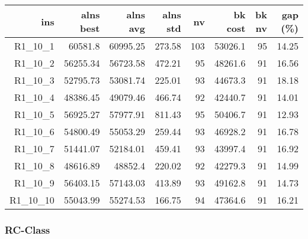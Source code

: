   \begin{table}[caption={Kết quả đo với tập HG\_R\_1\_10 1000 yêu cầu}, label=exp:HGR110]
    \centering
    \begin{tabular}{rrrrrrrr}
    \hline
    ins & alns best & alns avg & alns std & nv & bk cost & bk nv & gap (\%) \\ \hline
    R1\_10\_1 & 60581.8 & 60995.25 & 273.58 & 103 & 53026.1 & 95 & 14.25 \\ \hline
    R1\_10\_2 & 56255.34 & 56723.58 & 472.21 & 95 & 48261.6 & 91 & 16.56 \\ \hline
    R1\_10\_3 & 52795.73 & 53081.74 & 225.01 & 93 & 44673.3 & 91 & 18.18 \\ \hline
    R1\_10\_4 & 48386.45 & 49079.46 & 466.74 & 92 & 42440.7 & 91 & 14.01 \\ \hline
    R1\_10\_5 & 56925.27 & 57977.91 & 811.43 & 95 & 50406.7 & 91 & 12.93 \\ \hline
    R1\_10\_6 & 54800.49 & 55053.29 & 259.44 & 93 & 46928.2 & 91 & 16.78 \\ \hline
    R1\_10\_7 & 51441.07 & 52184.01 & 459.41 & 93 & 43997.4 & 91 & 16.92 \\ \hline
    R1\_10\_8 & 48616.89 & 48852.4 & 220.02 & 92 & 42279.3 & 91 & 14.99 \\ \hline
    R1\_10\_9 & 56403.15 & 57143.03 & 413.89 & 93 & 49162.8 & 91 & 14.73 \\ \hline
    R1\_10\_10 & 55043.99 & 55274.53 & 166.75 & 94 & 47364.6 & 91 & 16.21 \\ \hline
    \end{tabular}
  \end{table}

  \subsubsection*{RC-Class}

